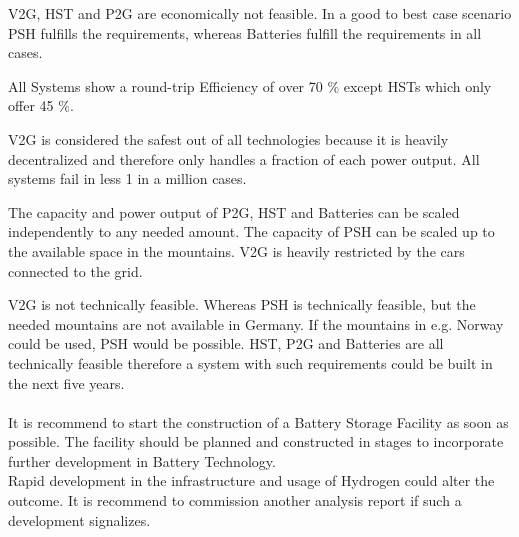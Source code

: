 \begin{parcolumns}[colwidths={1=2.5 cm, 2=10 cm, 3=2.5cm}]{3}
{\noindent V2G, HST and P2G are economically not feasible. In a good to best case scenario PSH fulfills the requirements, whereas Batteries fulfill the requirements in all cases.

\noindent All Systems show a round-trip Efficiency of over 70 $\%$ except HSTs which only offer 45 $\%$. 

\noindent V2G is considered the safest out of all technologies because it is heavily decentralized and therefore only handles a fraction of each power output. All systems fail in less 1 in a million cases. 

\noindent The capacity and power output of P2G, HST and Batteries can be scaled independently to any needed amount. The capacity of PSH can be scaled up to the available space in the mountains. V2G is heavily restricted by the cars connected to the grid. 

\noindent V2G is not technically feasible. Whereas PSH is technically feasible, but the needed mountains are not available in Germany. If the mountains in e.g. Norway could be used, PSH would be possible. HST, P2G and Batteries are all technically feasible therefore a system with such requirements could be built in the next five years. \\ \\
\noindent
It is recommend to start the construction of a Battery Storage Facility as soon as possible. The facility should be planned and constructed in stages to incorporate further development in Battery Technology. \\
\noindent 
Rapid development in the infrastructure and usage of Hydrogen could alter the outcome. It is recommend to commission another analysis report if such a development signalizes. \\

}
\end{parcolumns}

